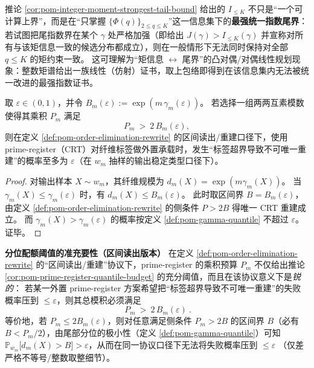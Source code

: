 \begin{remark}\label{rem:pom-integer-moment-tail-optimality}
推论 \ref{cor:pom-integer-moment-strongest-tail-bound} 给出的 \(I_{\le K}\) 不只是“一个可计算上界”，而是在“只掌握 \(\{\Phi(q)\}_{2\le q\le K}\)”这一信息集下的\textbf{最强统一指数尾界}：
若试图把尾指数界在某个 \(\gamma\) 处严格加强（即给出 \(J(\gamma)>I_{\le K}(\gamma)\) 并宣称对所有与该矩信息一致的候选分布都成立），则在一般情形下无法同时保持对全部 \(q\le K\) 的矩约束一致。
这可理解为“矩信息 \(\leftrightarrow\) 尾界”的凸对偶/对偶线性规划现象：整数矩谱给出一族线性（仿射）证书，取上包络即得到在该信息集内无法被统一改进的最强指数证书。
\end{remark}

\begin{corollary}\label{cor:pom-prime-register-quantile-budget}
取 \(\varepsilon\in(0,1)\)，并令 \(B_m(\varepsilon):=\exp(m\,\gamma_m(\varepsilon))\)。
若选择一组两两互素模数使得其乘积 \(P_m\) 满足
$$
P_m\ >\ 2\,B_m(\varepsilon),
$$
则在定义 \ref{def:pom-order-elimination-rewrite} 的区间读出/重建口径下，使用 prime-register（CRT）对纤维标签做外置承载时，发生“标签超界导致不可唯一重建”的概率至多为 \(\varepsilon\)（在 \(w_m\) 抽样的输出稳定类型口径下）。
\end{corollary}

\begin{proof}
对输出样本 \(X\sim w_m\)，其纤维规模为 \(d_m(X)=\exp(m\gamma_m(X))\)。
当 \(\gamma_m(X)\le\gamma_m(\varepsilon)\) 时，有 \(d_m(X)\le B_m(\varepsilon)\)。
此时取区间界 \(B=B_m(\varepsilon)\)，由定义 \ref{def:pom-order-elimination-rewrite} 的侧条件 \(P>2B\) 得唯一 CRT 重建成立。
而 \(\gamma_m(X)>\gamma_m(\varepsilon)\) 的概率按定义 \ref{def:pom-gamma-quantile} 不超过 \(\varepsilon\)。证毕。
\end{proof}

\medskip\noindent\textbf{分位配额阈值的准充要性（区间读出版本）}
在定义 \ref{def:pom-order-elimination-rewrite} 的“区间读出/重建”协议下，prime-register 的乘积预算 \(P_m\) 不仅给出推论 \ref{cor:pom-prime-register-quantile-budget} 的充分阈值，而且在该协议意义下是\emph{锐的}：
若某一外置 prime-register 方案希望把“标签超界导致不可唯一重建”的失败概率压到 \(\le \varepsilon\)，则其总模积必须满足
\[
\boxed{\ P_m\ >\ 2\,B_m(\varepsilon)\ }.
\]
等价地，若 \(P_m\le 2B_m(\varepsilon)\)，则对任意满足侧条件 \(P_m>2B\) 的区间界 \(B\)（必有 \(B<P_m/2\)），由尾部分位的极小性（定义 \ref{def:pom-gamma-quantile}）可知
\(\mathbb{P}_{w_m}\!\big[d_m(X)>B\big]>\varepsilon\)，从而在同一协议口径下无法将失败概率压到 \(\le\varepsilon\)
（仅差严格不等号/整数取整细节）。

